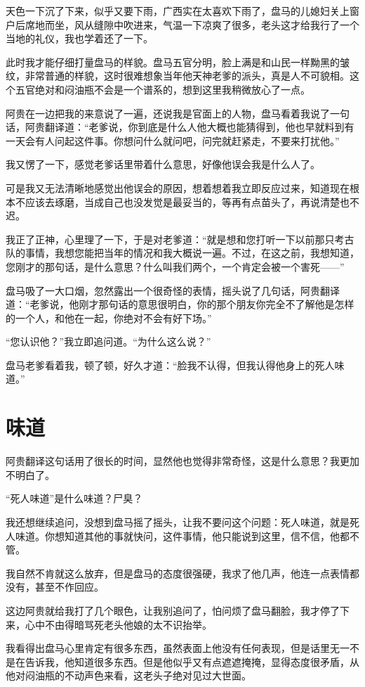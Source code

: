 天色一下沉了下来，似乎又要下雨，广西实在太喜欢下雨了，盘马的儿媳妇关上窗户后席地而坐，风从缝隙中吹进来，气温一下凉爽了很多，老头这才给我行了一个当地的礼仪，我也学着还了一下。

此时我才能仔细打量盘马的样貌。盘马五官分明，脸上满是和山民一样黝黑的皱纹，非常普通的样貌，这时很难想象当年他天神老爹的派头，真是人不可貌相。这个五官绝对和闷油瓶不会是一个谱系的，想到这里我稍微放心了一点。

阿贵在一边把我的来意说了一遍，还说我是官面上的人物，盘马看着我说了一句话，阿贵翻译道：“老爹说，你到底是什么人他大概也能猜得到，他也早就料到有一天会有人问起这件事。你想问什么就问吧，问完就赶紧走，不要来打扰他。”

我又愣了一下，感觉老爹话里带着什么意思，好像他误会我是什么人了。

可是我又无法清晰地感觉出他误会的原因，想着想着我立即反应过来，知道现在根本不应该去琢磨，当成自己也没发觉是最妥当的，等再有点苗头了，再说清楚也不迟。

我正了正神，心里理了一下，于是对老爹道：“就是想和您打听一下以前那只考古队的事情，我想您能把当年的情况和我大概说一遍。不过，在这之前，我想知道，您刚才的那句话，是什么意思？什么叫我们两个，一个肯定会被一个害死——”

盘马吸了一大口烟，忽然露出一个很奇怪的表情，摇头说了几句话，阿贵翻译道：“老爹说，他刚才那句话的意思很明白，你的那个朋友你完全不了解他是怎样的一个人，和他在一起，你绝对不会有好下场。”

“您认识他？”我立即追问道。“为什么这么说？”

盘马老爹看着我，顿了顿，好久才道：“脸我不认得，但我认得他身上的死人味道。”

\chapter{味道}

阿贵翻译这句话用了很长的时间，显然他也觉得非常奇怪，这是什么意思？我更加不明白了。

“死人味道”是什么味道？尸臭？

我还想继续追问，没想到盘马摇了摇头，让我不要问这个问题：死人味道，就是死人味道。你想知道其他的事就快问，这件事情，他只能说到这里，信不信，他都不管。

我自然不肯就这么放弃，但是盘马的态度很强硬，我求了他几声，他连一点表情都没有，甚至不作回应。

这边阿贵就给我打了几个眼色，让我别追问了，怕问烦了盘马翻脸，我才停了下来，心中不由得暗骂死老头他娘的太不识抬举。

我看得出盘马心里肯定有很多东西，虽然表面上他没有任何表现，但是话里无一不是在告诉我，他知道很多东西。但是他似乎又有点遮遮掩掩，显得态度很矛盾，从他对闷油瓶的不动声色来看，这老头子绝对见过大世面。

